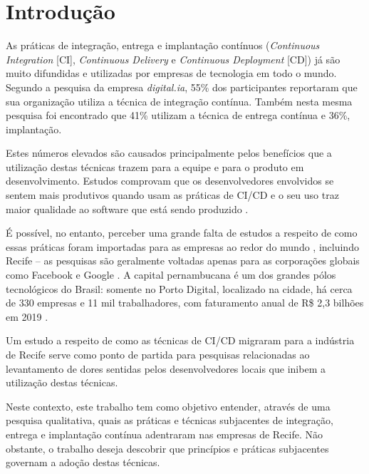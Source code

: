 
\section{Introdução}

As práticas de integração, entrega e implantação contínuos \cite{fowlerCI, fowlerCD} (\emph{Continuous Integration} [CI], \emph{Continuous Delivery} e \emph{Continuous Deployment} [CD]) já são muito difundidas e utilizadas por empresas de tecnologia em todo o mundo. Segundo a pesquisa da empresa \emph{digital.ia}\cite{stateAgileReport2020}, 55\% dos participantes reportaram que sua organização utiliza a técnica de integração contínua. Também nesta mesma pesquisa foi encontrado que 41\% utilizam a técnica de entrega contínua e 36\%, implantação.

Estes números elevados são causados principalmente pelos benefícios que a utilização destas técnicas trazem para a equipe e para o produto em desenvolvimento. Estudos comprovam que os desenvolvedores envolvidos se sentem mais produtivos quando usam as práticas de CI/CD \cite{hilton2016} e o seu uso traz maior qualidade ao software que está sendo produzido \cite{savor2015}. 

É possível, no entanto, perceber uma grande falta de estudos a respeito de como essas práticas foram importadas para as empresas ao redor do mundo \cite{empiricalStudy2016}, incluindo Recife -- as pesquisas são geralmente voltadas apenas para as corporações globais como Facebook \cite{savor2015} e Google \cite{googleCi}. A capital pernambucana é um dos grandes pólos tecnológicos do Brasil: somente no Porto Digital, localizado na cidade, há cerca de 330 empresas e 11 mil trabalhadores, com faturamento anual de R\$ 2,3 bilhões em 2019 \cite{portoDigital}.

Um estudo a respeito de como as técnicas de CI/CD migraram para a indústria de Recife serve como ponto de partida para pesquisas relacionadas ao levantamento de dores sentidas pelos desenvolvedores locais que inibem a utilização destas técnicas.

Neste contexto, este trabalho tem como objetivo entender, através de uma pesquisa qualitativa, quais as práticas e técnicas subjacentes de integração, entrega e implantação contínua adentraram nas empresas de Recife. Não obstante, o trabalho deseja descobrir que princípios e práticas subjacentes governam a adoção destas técnicas.
